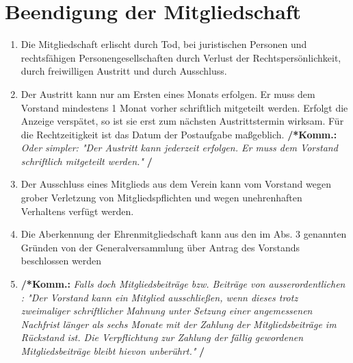 \documentclass[a4paper,12pt]{article}
\newcommand{\comment}[1]{{\bf /*Komm.:} \textit{#1} {\bf */}}
\begin{document}
\section{Beendigung der Mitgliedschaft} %
\begin{enumerate}
\item Die Mitgliedschaft erlischt durch Tod, bei juristischen Personen und rechtsfähigen Personengesellschaften durch Verlust der Rechtspersönlichkeit, durch freiwilligen Austritt und durch Ausschluss.

\item Der Austritt kann nur am Ersten eines Monats erfolgen. Er muss dem Vorstand mindestens 1 Monat vorher schriftlich mitgeteilt werden. Erfolgt die Anzeige verspätet, so ist sie erst zum nächsten Austrittstermin wirksam. Für die Rechtzeitigkeit ist das Datum der Postaufgabe maßgeblich.
\comment{Oder simpler: "Der Austritt kann jederzeit erfolgen. Er muss dem Vorstand schriftlich mitgeteilt werden." }

\item Der Ausschluss eines Mitglieds aus dem Verein kann vom Vorstand wegen grober Verletzung von Mitgliedspflichten und wegen unehrenhaften Verhaltens verfügt werden.
\item Die Aberkennung der Ehrenmitgliedschaft kann
aus den im Abs. 3 genannten Gründen
von der Generalversammlung über Antrag des Vorstands beschlossen werden

\item \comment{Falls doch Mitgliedsbeiträge bzw. Beiträge von ausserordentlichen : "Der Vorstand kann ein Mitglied ausschließen, wenn dieses trotz zweimaliger schriftlicher Mahnung unter Setzung einer angemessenen Nachfrist länger als sechs Monate mit der Zahlung der Mitgliedsbeiträge im Rückstand ist. Die Verpflichtung zur Zahlung der fällig gewordenen Mitgliedsbeiträge bleibt hievon unberührt."}

\end{enumerate}
\end{document}

